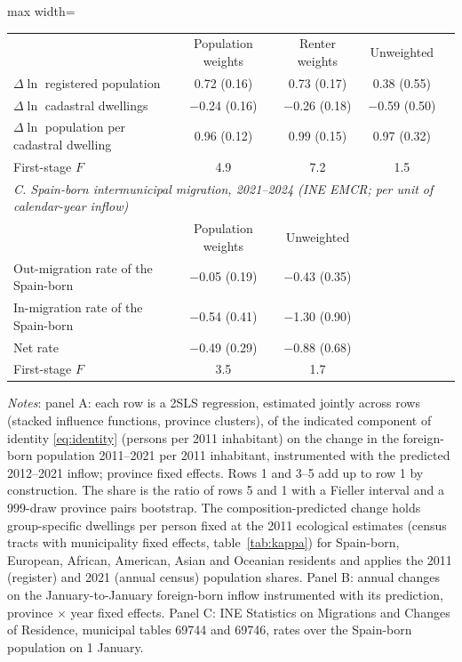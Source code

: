 \begin{table}[!htbp]
\begin{adjustbox}{max width=\linewidth}
\begin{tabular}{lcccc}
 & Population weights & Renter weights & Unweighted & \\
$\Delta\ln$ registered population & 0.72 (0.16) & 0.73 (0.17) & 0.38 (0.55) & \\
$\Delta\ln$ cadastral dwellings & $-$0.24 (0.16) & $-$0.26 (0.18) & $-$0.59 (0.50) & \\
$\Delta\ln$ population per cadastral dwelling & 0.96 (0.12) & 0.99 (0.15) & 0.97 (0.32) & \\
First-stage $F$ & 4.9 & 7.2 & 1.5 & \\
\midrule\multicolumn{5}{l}{\textit{C. Spain-born intermunicipal migration, 2021--2024 (INE EMCR; per unit of calendar-year inflow)}}\\
 & Population weights & Unweighted & & \\
Out-migration rate of the Spain-born & $-$0.05 (0.19) & $-$0.43 (0.35) & & \\
In-migration rate of the Spain-born & $-$0.54 (0.41) & $-$1.30 (0.90) & & \\
Net rate & $-$0.49 (0.29) & $-$0.88 (0.68) & & \\
First-stage $F$ & 3.5 & 1.7 & & \\
\bottomrule\end{tabular}\end{adjustbox}
\begin{minipage}{0.97\linewidth}\footnotesize\vspace{4pt}
\textit{Notes}: panel A: each row is a 2SLS regression, estimated jointly across rows (stacked influence functions, province clusters), of the indicated component of identity \eqref{eq:identity} (persons per 2011 inhabitant) on the change in the foreign-born population 2011--2021 per 2011 inhabitant, instrumented with the predicted 2012--2021 inflow; province fixed effects. Rows 1 and 3--5 add up to row 1 by construction. The share is the ratio of rows 5 and 1 with a Fieller interval and a 999-draw province pairs bootstrap. The composition-predicted change holds group-specific dwellings per person fixed at the 2011 ecological estimates (census tracts with municipality fixed effects, table~\ref{tab:kappa}) for Spain-born, European, African, American, Asian and Oceanian residents and applies the 2011 (register) and 2021 (annual census) population shares. Panel B: annual changes on the January-to-January foreign-born inflow instrumented with its prediction, province $\times$ year fixed effects. Panel C: INE Statistics on Migrations and Changes of Residence, municipal tables 69744 and 69746, rates over the Spain-born population on 1 January.
\end{minipage}\end{table}